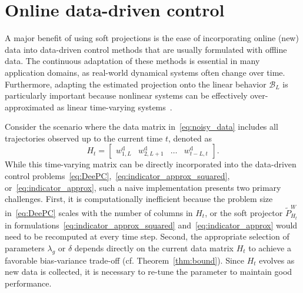 \documentclass[letterpaper, 10 pt, conference]{ieeeconf}
\begin{document}
\section{Online data-driven control} \label{sec:online}
A major benefit of using soft projections is the ease of incorporating online (new) data into data-driven control methods that are usually formulated with offline data.
The continuous adaptation of these methods is essential in many application domains, as real-world dynamical systems often change over time.
Furthermore, adapting the estimated projection onto the linear behavior $\mathcal{B}_L$ is particularly important because nonlinear systems can be effectively over-approximated as linear time-varying systems~\cite{berberich2024overview}.


Consider the scenario where the data matrix in~\eqref{eq:noisy_data} includes all trajectories observed up to the current time $t$, denoted as
$$
H_t = \begin{bmatrix}
    w^\mathrm{d}_{1,L} &w^\mathrm{d}_{2,L+1} & \dots & w^\mathrm{d}_{t-L,t}
\end{bmatrix}.
$$
While this time-varying matrix can be directly incorporated into the data-driven control problems~\eqref{eq:DeePC},~\eqref{eq:indicator_approx_squared}, or~\eqref{eq:indicator_approx}, such a naive implementation presents two primary challenges.
First, it is computationally inefficient because the problem size in~\eqref{eq:DeePC} scales with the number of columns in $H_t$, or the soft projector $\tilde{P}_{H_t}^W$ in formulations~\eqref{eq:indicator_approx_squared} and~\eqref{eq:indicator_approx} would need to be recomputed at every time step.
Second, the appropriate selection of parameters $\lambda_g$ or $\delta$ depends directly on the current data matrix $H_t$ to achieve a favorable bias-variance trade-off (cf. Theorem~\ref{thm:bound}).
Since $H_t$ evolves as new data is collected, it is necessary to re-tune the parameter to maintain good performance.
\end{document}

